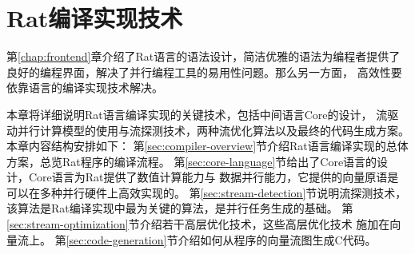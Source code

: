 \chapter{Rat编译实现技术}\label{chap:compiler}
第\ref{chap:frontend}章介绍了Rat语言的语法设计，简洁优雅的语法为编程者提供了
良好的编程界面，解决了并行编程工具的易用性问题。那么另一方面，
高效性要依靠语言的编译实现技术解决。

本章将详细说明Rat语言编译实现的关键技术，包括中间语言Core的设计，
流驱动并行计算模型的使用与流探测技术，两种流优化算法以及最终的代码生成方案。
本章内容结构安排如下：
第\ref{sec:compiler-overview}节介绍Rat语言编译实现的总体方案，总览Rat程序的编译流程。
第\ref{sec:core-language}节给出了Core语言的设计，Core语言为Rat提供了数值计算能力与
数据并行能力，它提供的向量原语是可以在多种并行硬件上高效实现的。
第\ref{sec:stream-detection}节说明流探测技术，该算法是Rat编译实现中最为关键的算法，是并行任务生成的基础。
第\ref{sec:stream-optimization}节介绍若干高层优化技术，这些高层优化技术
施加在向量流上。
第\ref{sec:code-generation}节介绍如何从程序的向量流图生成C代码。

